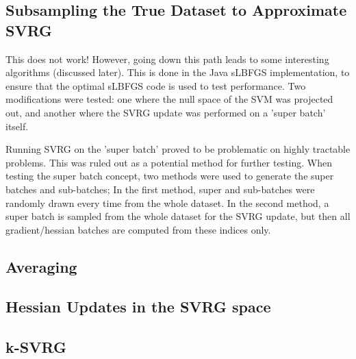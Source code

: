 \documentclass{article}
\begin{document}
\subsection{Subsampling the True Dataset to Approximate SVRG}
This does not work! However, going down this path leads to some interesting algorithms (discussed later).
This is done in the Java sLBFGS implementation, to ensure that the optimal sLBFGS code is used to test performance.
Two modifications were tested: one where the null space of the SVM was projected out, and another where the SVRG update was performed on a 'super batch' itself.

Running SVRG on the 'super batch' proved to be problematic on highly tractable problems. This was ruled out as a potential method for further testing.
When testing the super batch concept, two methods were used to generate the super batches and sub-batches; 
In the first method, super and sub-batches were randomly drawn every time from the whole dataset.
In the second method, a super batch is sampled from the whole dataset for the SVRG update, but then all gradient/hessian batches are computed from these indices only.
\subsection{Averaging}
\subsection{Hessian Updates in the SVRG space}
\subsection{k-SVRG} 
\end{document}
